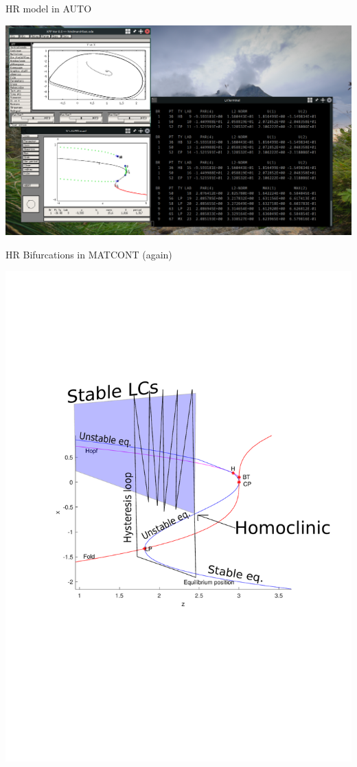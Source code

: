 \documentclass{beamer}
\begin{document}
\begin{frame}[label={sec:org0c450eb}]{HR model in AUTO}
\begin{center}
\includegraphics[height=.9\textheight]{auto2.png}
\end{center}
\end{frame}

\begin{frame}[label={sec:orgd7be187}]{HR Bifurcations in MATCONT (again)}
\begin{center}
\includegraphics[trim={3cm 9cm 0cm 5cm}, clip,height=.9\textheight]{HRzbBif2 (copy 1).pdf}
\end{center}
\end{frame}
\end{document}
